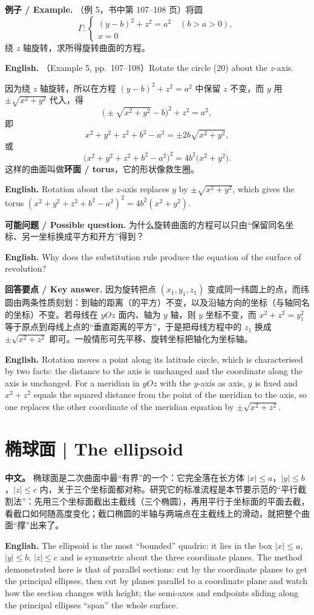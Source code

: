\documentclass[UTF8,11pt,a4paper]{ctexart}
\newcommand{\APS}[2]{\par\noindent\textbf{中文。} #1\par\noindent\textbf{English.} #2\par\smallskip}
\newcommand{\EN}[1]{\par\noindent \textbf{English.} #1\par}
\newcommand{\EX}[2]{\par\noindent \textbf{例子 / Example.} #1\par\EN{#2}}
\newcommand{\ASK}[4]{\par\noindent \textbf{可能问题 / Possible question.} #1\par\EN{#2}\noindent \textbf{回答要点 / Key answer.} #3\par\EN{#4}\medskip}
\theoremstyle{definition}
\begin{document}
\EX{（例 5，书中第 107--108 页）将圆
\[
\Gamma:\begin{cases}(y-b)^2+z^2=a^2\quad(b>a>0),\\ x=0\end{cases}\tag{20}
\]
绕 $z$ 轴旋转，求所得旋转曲面的方程。}{（Example 5, pp.~107--108）Rotate the circle (20) about the $z$-axis.}
因为绕 $z$ 轴旋转，所以在方程 $(y-b)^2+z^2=a^2$ 中保留 $z$ 不变，而 $y$ 用 $\pm\sqrt{x^2+y^2}$ 代入，得
\[
\bigl(\pm\sqrt{x^2+y^2}-b\bigr)^2+z^2=a^2,
\]
即
\[
x^2+y^2+z^2+b^2-a^2=\pm 2b\sqrt{x^2+y^2},
\]
或
\[
\bigl(x^2+y^2+z^2+b^2-a^2\bigr)^2=4b^2\bigl(x^2+y^2\bigr).
\]
这样的曲面叫做\textbf{环面 / torus}，它的形状像救生圈。
\EN{Rotation about the $z$-axis replaces $y$ by $\pm\sqrt{x^2+y^2}$, which gives the torus $(x^2+y^2+z^2+b^2-a^2)^2=4b^2(x^2+y^2)$.}

\ASK{为什么旋转曲面的方程可以只由``保留同名坐标、另一坐标换成平方和开方''得到？}{Why does the substitution rule produce the equation of the surface of revolution?}{因为旋转把点 $(x_1,y_1,z_1)$ 变成同一纬圆上的点，而纬圆由两条性质刻划：到轴的距离（的平方）不变，以及沿轴方向的坐标（与轴同名的坐标）不变。若母线在 $yOz$ 面内、轴为 $y$ 轴，则 $y$ 坐标不变，而 $x^2+z^2=y_1^2$ 等于原点到母线上点的``垂直距离的平方''，于是把母线方程中的 $z_1$ 换成 $\pm\sqrt{x^2+z^2}$ 即可。一般情形可先平移、旋转坐标把轴化为坐标轴。}{Rotation moves a point along its latitude circle, which is characterised by two facts: the distance to the axis is unchanged and the coordinate along the axis is unchanged. For a meridian in $yOz$ with the $y$-axis as axis, $y$ is fixed and $x^2+z^2$ equals the squared distance from the point of the meridian to the axis, so one replaces the other coordinate of the meridian equation by $\pm\sqrt{x^2+z^2}$.}

\section{\label{sec:4}椭球面 | The ellipsoid}
\APS{椭球面是二次曲面中最``有界''的一个：它完全落在长方体 $|x|\le a$，$|y|\le b$，$|z|\le c$ 内，关于三个坐标面都对称。研究它的标准流程是本节要示范的``平行截割法''：先用三个坐标面截出主截线（三个椭圆），再用平行于坐标面的平面去截，看截口如何随高度变化；截口椭圆的半轴与两端点在主截线上的滑动，就把整个曲面``撑''出来了。}{The ellipsoid is the most ``bounded'' quadric: it lies in the box $|x|\le a$, $|y|\le b$, $|z|\le c$ and is symmetric about the three coordinate planes. The method demonstrated here is that of parallel sections: cut by the coordinate planes to get the principal ellipses, then cut by planes parallel to a coordinate plane and watch how the section changes with height; the semi-axes and endpoints sliding along the principal ellipses ``span'' the whole surface.}
\end{document}
